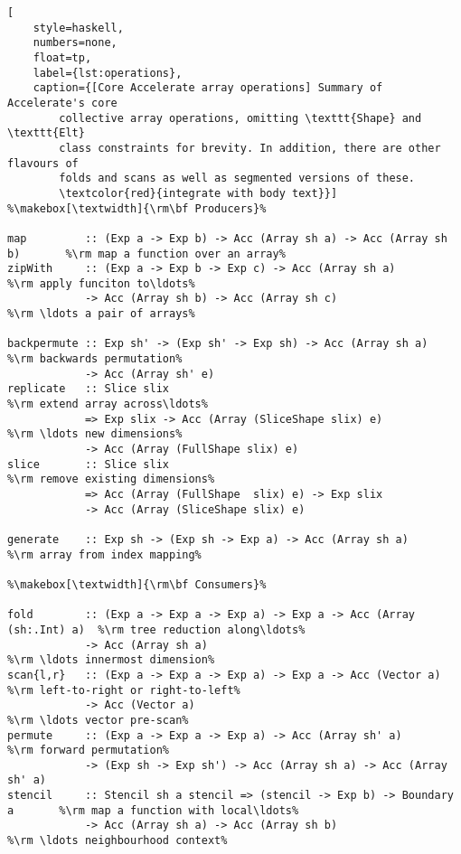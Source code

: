 \begin{lstlisting}[
    style=haskell,
    numbers=none,
    float=tp,
    label={lst:operations},
    caption={[Core Accelerate array operations] Summary of Accelerate's core
        collective array operations, omitting \texttt{Shape} and \texttt{Elt}
        class constraints for brevity. In addition, there are other flavours of
        folds and scans as well as segmented versions of these.
        \textcolor{red}{integrate with body text}}]
%\makebox[\textwidth]{\rm\bf Producers}%

map         :: (Exp a -> Exp b) -> Acc (Array sh a) -> Acc (Array sh b)       %\rm map a function over an array%
zipWith     :: (Exp a -> Exp b -> Exp c) -> Acc (Array sh a)                  %\rm apply funciton to\ldots%
            -> Acc (Array sh b) -> Acc (Array sh c)                           %\rm \ldots a pair of arrays%

backpermute :: Exp sh' -> (Exp sh' -> Exp sh) -> Acc (Array sh a)             %\rm backwards permutation%
            -> Acc (Array sh' e)
replicate   :: Slice slix                                                     %\rm extend array across\ldots%
            => Exp slix -> Acc (Array (SliceShape slix) e)                    %\rm \ldots new dimensions%
            -> Acc (Array (FullShape slix) e)
slice       :: Slice slix                                                     %\rm remove existing dimensions%
            => Acc (Array (FullShape  slix) e) -> Exp slix
            -> Acc (Array (SliceShape slix) e)

generate    :: Exp sh -> (Exp sh -> Exp a) -> Acc (Array sh a)                %\rm array from index mapping%

%\makebox[\textwidth]{\rm\bf Consumers}%

fold        :: (Exp a -> Exp a -> Exp a) -> Exp a -> Acc (Array (sh:.Int) a)  %\rm tree reduction along\ldots%
            -> Acc (Array sh a)                                               %\rm \ldots innermost dimension%
scan{l,r}   :: (Exp a -> Exp a -> Exp a) -> Exp a -> Acc (Vector a)           %\rm left-to-right or right-to-left%
            -> Acc (Vector a)                                                 %\rm \ldots vector pre-scan%
permute     :: (Exp a -> Exp a -> Exp a) -> Acc (Array sh' a)                 %\rm forward permutation%
            -> (Exp sh -> Exp sh') -> Acc (Array sh a) -> Acc (Array sh' a)
stencil     :: Stencil sh a stencil => (stencil -> Exp b) -> Boundary a       %\rm map a function with local\ldots%
            -> Acc (Array sh a) -> Acc (Array sh b)                           %\rm \ldots neighbourhood context%
\end{lstlisting}

